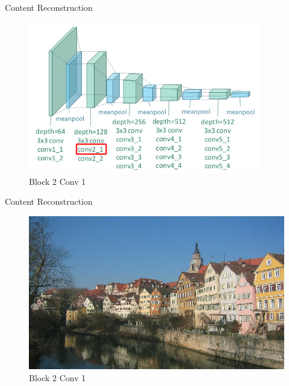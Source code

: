 \documentclass{beamer}
\begin{document}
\begin{frame}{Content Reconstruction}
\begin{figure}[ht]
\centering
\includegraphics[width=0.9\textwidth]{img/vgg19/content/block2_conv1}
\caption*{Block 2 Conv 1}
\end{figure}
\end{frame}
\begin{frame}{Content Reconstruction}
\begin{figure}[ht]
\centering
\includegraphics[width=.9\textwidth]{img/content/block2_conv1.png}
\caption*{Block 2 Conv 1}
\end{figure}
\end{frame}
\end{document}

